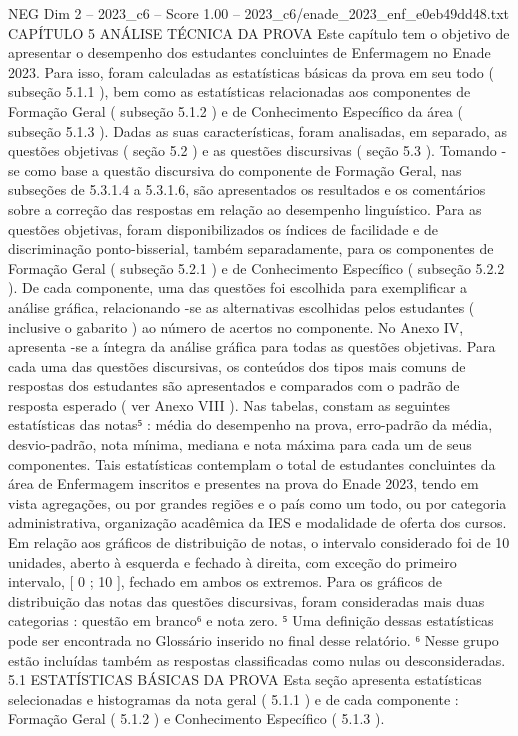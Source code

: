 \begin{textsample}{NEG Dim 2 – 2023\_c6 – Score 1.00 – 2023\_c6/enade\_2023\_enf\_e0eb49dd48.txt}  \label{ex:f2_neg_270}
CAPÍTULO 5 ANÁLISE TÉCNICA DA PROVA Este capítulo tem o objetivo de apresentar o desempenho dos estudantes concluintes de Enfermagem no Enade 2023.
Para isso, foram calculadas as estatísticas básicas da prova em seu todo ( subseção 5.1.1 ), bem como as estatísticas relacionadas aos componentes de Formação Geral ( subseção 5.1.2 ) e de Conhecimento Específico da área ( subseção 5.1.3 ).
Dadas as suas características, foram analisadas, em separado, as questões objetivas ( seção 5.2 ) e as questões discursivas ( seção 5.3 ).
Tomando -se como base a questão discursiva do componente de Formação Geral, nas subseções de 5.3.1.4 a 5.3.1.6, são apresentados os resultados e os comentários sobre a correção das respostas em relação ao desempenho linguístico.
Para as questões objetivas, foram disponibilizados os índices de facilidade e de discriminação ponto-bisserial, também separadamente, para os componentes de Formação Geral ( subseção 5.2.1 ) e de Conhecimento Específico ( subseção 5.2.2 ).
De cada componente, uma das questões foi escolhida para exemplificar a análise gráfica, relacionando -se as alternativas escolhidas pelos estudantes ( inclusive o gabarito ) ao número de acertos no componente.
No Anexo IV, apresenta -se a íntegra da análise gráfica para todas as questões objetivas.
Para cada uma das questões discursivas, os conteúdos dos tipos mais comuns de respostas dos estudantes são apresentados e comparados com o padrão de resposta esperado ( ver Anexo VIII ).
Nas tabelas, constam as seguintes estatísticas das notas⁵ : média do desempenho na prova, erro-padrão da média, desvio-padrão, nota mínima, mediana e nota máxima para cada um de seus componentes.
Tais estatísticas contemplam o total de estudantes concluintes da área de Enfermagem inscritos e presentes na prova do Enade 2023, tendo em vista agregações, ou por grandes regiões e o país como um todo, ou por categoria administrativa, organização acadêmica da IES e modalidade de oferta dos cursos.
Em relação aos gráficos de distribuição de notas, o intervalo considerado foi de 10 unidades, aberto à esquerda e fechado à direita, com exceção do primeiro intervalo, [ 0 ; 10 ], fechado em ambos os extremos.
Para os gráficos de distribuição das notas das questões discursivas, foram consideradas mais duas categorias : questão em branco⁶ e nota zero. ⁵ Uma definição dessas estatísticas pode ser encontrada no Glossário inserido no final desse relatório. ⁶ Nesse grupo estão incluídas também as respostas classificadas como nulas ou desconsideradas. 5.1 ESTATÍSTICAS BÁSICAS DA PROVA Esta seção apresenta estatísticas selecionadas e histogramas da nota geral ( 5.1.1 ) e de cada componente : Formação Geral ( 5.1.2 ) e Conhecimento Específico ( 5.1.3 ).

\end{textsample}

